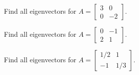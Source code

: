 \documentclass[../main.tex]{subfiles}
\begin{document}
\begin{example}
  Find all eigenvectors for \(A = \begin{bmatrix} 3 & 0 \\ 0 & -2 \end{bmatrix}\).

\end{example}
\clearpage

\begin{example}
  Find all eigenvectors for \(A = \begin{bmatrix} 0 & -1 \\ 2 & 1 \end{bmatrix}\).

\end{example}

\begin{example}
  Find all eigenvectors for \(A = \begin{bmatrix} 1/2 & 1 \\ -1 & 1/3 \end{bmatrix}\).

\end{example}
\end{document}
